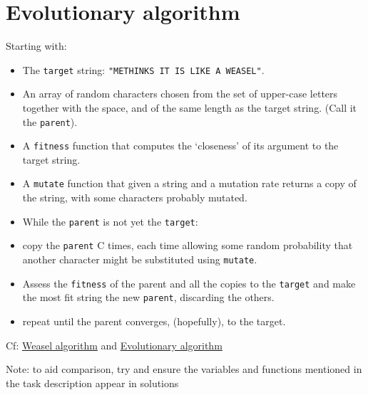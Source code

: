 \pagebreak{}
\section*{Evolutionary algorithm}

Starting with:

\begin{itemize}
\item
  The \texttt{target} string: \texttt{"METHINKS IT IS LIKE A WEASEL"}.
\item
  An array of random characters chosen from the set of upper-case
  letters together with the space, and of the same length as the target
  string. (Call it the \texttt{parent}).
\item
  A \texttt{fitness} function that computes the `closeness' of its
  argument to the target string.
\item
  A \texttt{mutate} function that given a string and a mutation rate
  returns a copy of the string, with some characters probably mutated.
\item
  While the \texttt{parent} is not yet the \texttt{target}:
\end{itemize}

\begin{itemize}
\item
  copy the \texttt{parent} C times, each time allowing some random
  probability that another character might be substituted using
  \texttt{mutate}.
\item
  Assess the \texttt{fitness} of the parent and all the copies to the
  \texttt{target} and make the most fit string the new \texttt{parent},
  discarding the others.
\item
  repeat until the parent converges, (hopefully), to the target.
\end{itemize}

Cf:
\href{http://en.wikipedia.org/wiki/Weasel\_program\#Weasel\_algorithm}{Weasel
algorithm} and
\href{http://en.wikipedia.org/wiki/Evolutionary\_algorithm}{Evolutionary
algorithm}

Note: to aid comparison, try and ensure the variables and functions
mentioned in the task description appear in solutions



